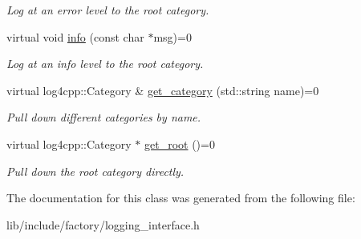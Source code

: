 \begin{DoxyCompactItemize}
\begin{DoxyCompactList}\small\item\em Log at an error level to the root category. \end{DoxyCompactList}\item 
\hypertarget{classLoggingInterface_a7aed25910dd1cdebe3906b4b33d75a80}{virtual void \hyperlink{classLoggingInterface_a7aed25910dd1cdebe3906b4b33d75a80}{info} (const char $\ast$msg)=0}\label{classLoggingInterface_a7aed25910dd1cdebe3906b4b33d75a80}

\begin{DoxyCompactList}\small\item\em Log at an info level to the root category. \end{DoxyCompactList}\item 
\hypertarget{classLoggingInterface_a33d93639b6500bbd0d67315d245860b9}{virtual log4cpp\-::\-Category \& \hyperlink{classLoggingInterface_a33d93639b6500bbd0d67315d245860b9}{get\-\_\-category} (std\-::string name)=0}\label{classLoggingInterface_a33d93639b6500bbd0d67315d245860b9}

\begin{DoxyCompactList}\small\item\em Pull down different categories by name. \end{DoxyCompactList}\item 
\hypertarget{classLoggingInterface_a5f64d03f0d83fc2f23fcca4252621734}{virtual log4cpp\-::\-Category $\ast$ \hyperlink{classLoggingInterface_a5f64d03f0d83fc2f23fcca4252621734}{get\-\_\-root} ()=0}\label{classLoggingInterface_a5f64d03f0d83fc2f23fcca4252621734}

\begin{DoxyCompactList}\small\item\em Pull down the root category directly. \end{DoxyCompactList}\end{DoxyCompactItemize}


The documentation for this class was generated from the following file\-:\begin{DoxyCompactItemize}
\item 
lib/include/factory/logging\-\_\-interface.\-h\end{DoxyCompactItemize}
